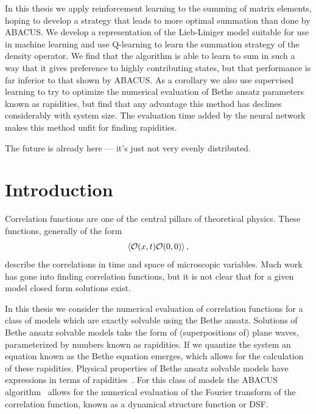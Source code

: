 \documentclass[11pt, a4paper]{report} %
\begin{document}
In this thesis we apply reinforcement learning to the summing of matrix elements, hoping to develop a strategy that leads to more optimal summation than done by ABACUS.\@
We develop a representation of the Lieb-Liniger model suitable for use in machine learning and use Q-learning to learn the summation strategy of the density operator.
We find that the algorithm is able to learn to sum in such a way that it gives preference to highly contributing states, but that performance is far inferior to that shown by ABACUS.\@
As a corollary we also use supervised learning to try to optimize the numerical evaluation of Bethe ansatz parameters known as rapidities, but find that any advantage this method has declines considerably with system size.
The evaluation time added by the neural network makes this method unfit for finding rapidities.

\tableofcontents


\begin{savequote}[50mm]
The future is already here --- it's just not very evenly distributed.
\end{savequote}


\chapter{Introduction}

Correlation functions are one of the central pillars of theoretical physics.
These functions, generally of the form
\begin{align}
  \label{eq:55}
  \expval{\mathcal{O}(x,t)\mathcal{O}(0,0)},
\end{align}
describe the correlations in time and space of microscopic variables.
Much work has gone into finding correlation functions, but it is not clear that for a given model closed form solutions exist.

In this thesis we consider the numerical evaluation of correlation functions for a class of models which are exactly solvable using the Bethe ansatz.
Solutions of Bethe ansatz solvable models take the form of (superpositions of) plane waves, parameterized by numbers known as rapidities.
If we quantize the system an equation known as the Bethe equation emerges, which allows for the calculation of these rapidities.
Physical properties of Bethe ansatz solvable models have expressions in terms of rapidities~\cite{Korepin1993}.
For this class of models the ABACUS algorithm~\cite{Caux2009} allows for the numerical evaluation of the Fourier transform of the correlation function, known as a dynamical structure function or DSF.\@
\end{document}
